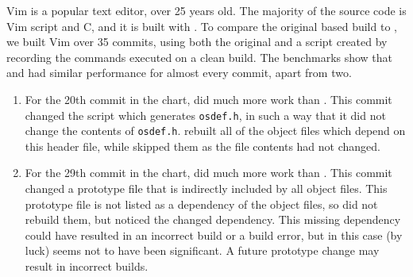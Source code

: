 
Vim is a popular text editor, over 25 years old. The majority of the source code is Vim script and C, and it is built with \Make. To compare the original \Make based build to \Rattle, we built Vim over 35 commits, using both the original \Make and a \Rattle script created by recording the commands \Make executed on a clean build. The benchmarks show that \Make and \Rattle had similar performance for almost every commit, apart from two.

\begin{enumerate}
\item For the 20th commit in the chart, \Make did much more work than \Rattle. This commit changed the script which generates \texttt{osdef.h}, in such a way that it did not change the contents of \texttt{osdef.h}. \Make rebuilt all of the object files which depend on this header file, while \Rattle skipped them as the file contents had not changed.
\item For the 29th commit in the chart, \Rattle did much more work than \Make. This commit changed a prototype file that is indirectly included by all object files.  This prototype file is not listed as a dependency of the object files, so \Make did not rebuild them, but \Rattle noticed the changed dependency.  This missing dependency could have resulted in an incorrect build or a build error, but in this case (by luck) seems not to have been significant. A future prototype change may result in incorrect builds.
\end{enumerate}

